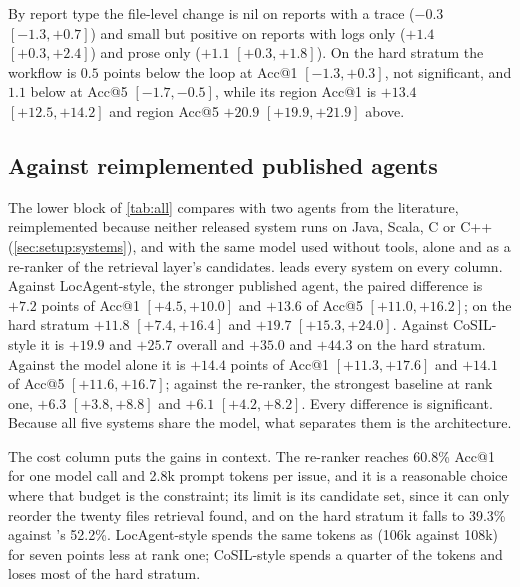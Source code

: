 By report type the file-level change is nil on reports with a trace
($-0.3$ $[-1.3, +0.7]$) and small but positive on reports with logs only
($+1.4$ $[+0.3, +2.4]$) and prose only ($+1.1$ $[+0.3, +1.8]$). On the
hard stratum the workflow is $0.5$ points below the loop at Acc@1
$[-1.3, +0.3]$, not significant, and $1.1$ below at Acc@5
$[-1.7, -0.5]$, while its region Acc@1 is $+13.4$ $[+12.5, +14.2]$ and
region Acc@5 $+20.9$ $[+19.9, +21.9]$ above.

\subsection{Against reimplemented published agents}
\label{sec:results:agents}

The lower block of \cref{tab:all} compares \sys{} with two agents from
the literature, reimplemented because neither released system runs on
Java, Scala, C or C++ (\cref{sec:setup:systems}), and with the same
model used without tools, alone and as a re-ranker of the retrieval
layer's candidates.
\sys{} leads every system on every column. Against LocAgent-style, the
stronger published agent, the paired difference is $+7.2$ points of
Acc@1 $[+4.5, +10.0]$ and $+13.6$ of Acc@5 $[+11.0, +16.2]$; on the
hard stratum $+11.8$ $[+7.4, +16.4]$ and $+19.7$ $[+15.3, +24.0]$.
Against CoSIL-style it is $+19.9$ and $+25.7$ overall and $+35.0$ and
$+44.3$ on the hard stratum. Against the model alone it is $+14.4$
points of Acc@1 $[+11.3, +17.6]$ and $+14.1$ of Acc@5 $[+11.6, +16.7]$;
against the re-ranker, the strongest baseline at rank one, $+6.3$
$[+3.8, +8.8]$ and $+6.1$ $[+4.2, +8.2]$. Every difference is
significant. Because all five systems share the model, what separates
them is the architecture.

The cost column puts the gains in context. The re-ranker reaches 60.8\%
Acc@1 for one model call and 2.8k prompt tokens per issue, and it is a
reasonable choice where that budget is the constraint; its limit is its
candidate set, since it can only reorder the twenty files retrieval
found, and on the hard stratum it falls to 39.3\% against \sys{}'s
52.2\%. LocAgent-style spends the same tokens as \sys{} (106k against
108k) for seven points less at rank one; CoSIL-style spends a quarter
of the tokens and loses most of the hard stratum.

